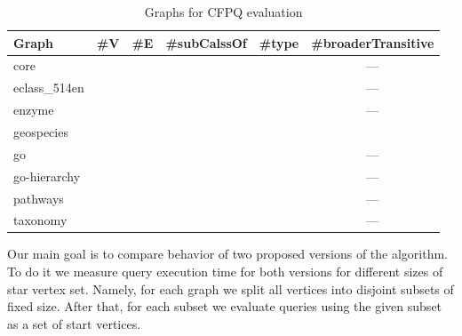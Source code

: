 {\setlength{\tabcolsep}{0.2em}
\begin{table}
{
\caption{Graphs for CFPQ evaluation}
\label{tbl:graphs_for_cfpq}
\small
{}
\begin{tabular}{|l|c|c|c|c|c|}
\hline
Graph          & \#V       & \#E        & \#subCalssOf & \#type &\#broaderTransitive\\
\hline
\hline 
core           &           &            &              &        &        ---        \\
eclass\_514en  &           &            &              &        &        ---        \\
enzyme         &           &            &              &        &        ---        \\
geospecies     &           &            &              &        &                   \\
go             &           &            &              &        &        ---        \\
go-hierarchy   &           &            &              &        &        ---        \\
pathways       &           &            &              &        &        ---        \\
taxonomy       &           &            &              &        &        ---        \\
\hline
\end{tabular}
}
\end{table}
}


Our main goal is to compare behavior of two proposed versions of the algorithm.
To do it we measure query execution time for both versions for different sizes of star vertex set. 
Namely, for each graph we split all vertices into disjoint subsets of fixed size.
After that, for each subset we evaluate queries using the given subset as a set of start vertices. 

